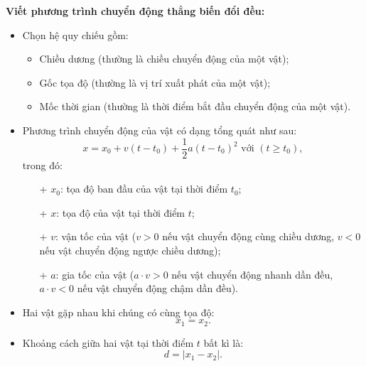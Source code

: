\setcounter{section}{0}
\textbf{Viết phương trình chuyển động thẳng biến đổi đều:}
\begin{itemize}
	\item Chọn hệ quy chiếu gồm:
	\begin{itemize}
		\item Chiều dương (thường là chiều chuyển động của một vật);
		\item Gốc tọa độ (thường là vị trí xuất phát của một vật);
		\item Mốc thời gian (thường là thời điểm bắt đầu chuyển động của một vật).
	\end{itemize}
	\item Phương trình chuyển động của vật có dạng tổng quát như sau:
	\begin{equation*}
		x=x_0+v(t-t_0)+\dfrac{1}{2}a(t-t_0)^2\textrm{ với }(t\geq t_0),
	\end{equation*}
	trong đó:
	\begin{itemize}
		\item[+] $x_0$: tọa độ ban đầu của vật tại thời điểm $t_0$;
		\item[+] $x$: tọa độ của vật tại thời điểm $t$;
		\item[+] $v$: vận tốc của vật ($v>0$ nếu vật chuyển động cùng chiều dương, $v<0$ nếu vật chuyển động ngược chiều dương);
		\item[+] $a$: gia tốc của vật ($a\cdot v > 0$ nếu vật chuyển động nhanh dần đều, $a\cdot v< 0$ nếu vật chuyển động chậm dần đều).
	\end{itemize}
	\item Hai vật gặp nhau khi chúng có cùng tọa độ:
	\begin{equation*}
		x_1=x_2.
	\end{equation*}
	\item Khoảng cách giữa hai vật tại thời điểm $t$ bất kì là:
	\begin{equation*}
		d=\left|x_1-x_2\right|.
	\end{equation*}
\end{itemize}	
